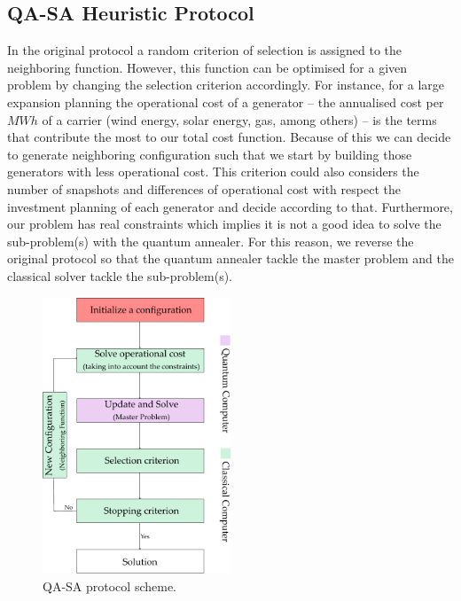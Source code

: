\subsection{QA-SA Heuristic Protocol}
In the original protocol a random criterion of selection is assigned to the neighboring function. However, this function can be optimised for a given problem by changing the selection criterion accordingly. For instance, for a large expansion planning the operational cost of a generator -- the annualised cost per $MWh$ of a carrier (wind energy, solar energy, gas, among others) --  is the terms that contribute the most to our total cost function. Because of this we can decide to generate neighboring configuration such that we start by building those generators with less operational cost. This criterion could also considers the number of snapshots and differences of operational cost with respect the investment planning of each generator and decide according to that. Furthermore, our problem has real constraints which implies it is not a good idea to solve the sub-problem(s) with the quantum annealer. For this reason, we reverse the original protocol so that the quantum annealer tackle the master problem and the classical solver tackle the sub-problem(s).
\begin{figure}[H]
\centering
\includegraphics[width=0.5\textwidth]{Figures/QASAProtocol_Layer 1.pdf} 
\caption{QA-SA protocol scheme.}
\label{fig:QA_SAProtocol}
\end{figure}
